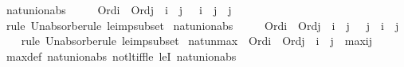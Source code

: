 \begin{isabellebody}
\isanewline
{}\isamarkupfalse%
\ nat{\isacharunderscore}{\kern0pt}union{\isacharunderscore}{\kern0pt}abs{}\ {\isacharcolon}{\kern0pt}\ \isanewline
\ \ {\isachardoublequoteopen}{\isasymlbrakk}\ Ord{\isacharparenleft}{\kern0pt}i{\isacharparenright}{\kern0pt}\ {\isacharsemicolon}{\kern0pt}\ Ord{\isacharparenleft}{\kern0pt}j{\isacharparenright}{\kern0pt}\ {\isacharsemicolon}{\kern0pt}\ i\ {\isasymle}\ j\ {\isasymrbrakk}\ {\isasymLongrightarrow}\ i\ {\isasymunion}\ j\ {\isacharequal}{\kern0pt}\ j{\isachardoublequoteclose}\isanewline
%
\isadelimproof
\ \ %
\endisadelimproof
%
\isatagproof
{}\isamarkupfalse%
\ {\isacharparenleft}{\kern0pt}rule\ Un{\isacharunderscore}{\kern0pt}absorb{}{\isacharcomma}{\kern0pt}erule\ le{\isacharunderscore}{\kern0pt}imp{\isacharunderscore}{\kern0pt}subset{\isacharparenright}{\kern0pt}%
\endisatagproof
{\isafoldproof}%
%
\isadelimproof
\isanewline
%
\endisadelimproof
\isanewline
{}\isamarkupfalse%
\ nat{\isacharunderscore}{\kern0pt}union{\isacharunderscore}{\kern0pt}abs{}\ {\isacharcolon}{\kern0pt}\ \isanewline
\ \ {\isachardoublequoteopen}{\isasymlbrakk}\ Ord{\isacharparenleft}{\kern0pt}i{\isacharparenright}{\kern0pt}\ {\isacharsemicolon}{\kern0pt}\ Ord{\isacharparenleft}{\kern0pt}j{\isacharparenright}{\kern0pt}\ {\isacharsemicolon}{\kern0pt}\ i\ {\isasymle}\ j\ {\isasymrbrakk}\ {\isasymLongrightarrow}\ j\ {\isasymunion}\ i\ {\isacharequal}{\kern0pt}\ j{\isachardoublequoteclose}\isanewline
%
\isadelimproof
\ \ %
\endisadelimproof
%
\isatagproof
{}\isamarkupfalse%
\ {\isacharparenleft}{\kern0pt}rule\ Un{\isacharunderscore}{\kern0pt}absorb{}{\isacharcomma}{\kern0pt}erule\ le{\isacharunderscore}{\kern0pt}imp{\isacharunderscore}{\kern0pt}subset{\isacharparenright}{\kern0pt}%
\endisatagproof
{\isafoldproof}%
%
\isadelimproof
\isanewline
%
\endisadelimproof
\isanewline
{}\isamarkupfalse%
\ nat{\isacharunderscore}{\kern0pt}un{\isacharunderscore}{\kern0pt}max\ {\isacharcolon}{\kern0pt}\ {\isachardoublequoteopen}Ord{\isacharparenleft}{\kern0pt}i{\isacharparenright}{\kern0pt}\ {\isasymLongrightarrow}\ Ord{\isacharparenleft}{\kern0pt}j{\isacharparenright}{\kern0pt}\ {\isasymLongrightarrow}\ i\ {\isasymunion}\ j\ {\isacharequal}{\kern0pt}\ max{\isacharparenleft}{\kern0pt}i{\isacharcomma}{\kern0pt}j{\isacharparenright}{\kern0pt}{\isachardoublequoteclose}\isanewline
%
\isadelimproof
\ \ %
\endisadelimproof
%
\isatagproof
{}\isamarkupfalse%
\ max{\isacharunderscore}{\kern0pt}def\ nat{\isacharunderscore}{\kern0pt}union{\isacharunderscore}{\kern0pt}abs{}\ not{\isacharunderscore}{\kern0pt}lt{\isacharunderscore}{\kern0pt}iff{\isacharunderscore}{\kern0pt}le\ leI\ nat{\isacharunderscore}{\kern0pt}union{\isacharunderscore}{\kern0pt}abs{}\isanewline

\end{isabellebody}
